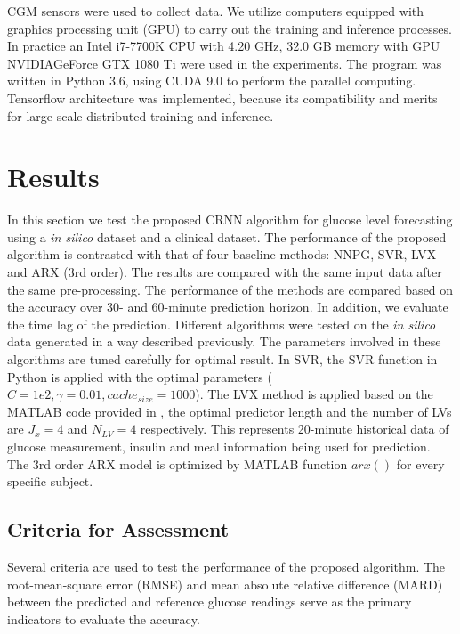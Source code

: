 \documentclass[a4paper, 10 pt, twocolumn]{IEEEtran}
\begin{document}
CGM sensors were used to collect data. We utilize computers equipped with graphics processing unit (GPU) to carry out the training and inference processes. In practice an Intel i7-7700K CPU with 4.20 GHz, 32.0 GB memory
with GPU NVIDIA\@ GeForce GTX 1080 Ti were used in the experiments. The program was written in Python 3.6, using CUDA 9.0 to perform the parallel computing.
Tensorflow architecture was implemented, because its compatibility and merits for large-scale distributed training and inference. %

\section{Results}

 In this section we test the proposed CRNN algorithm for glucose level forecasting using a \emph{in silico} dataset and a clinical dataset. The performance of the proposed algorithm is contrasted with that of four
 baseline methods: NNPG, SVR, LVX and ARX (3rd order). The results are compared with the same input data after the same pre-processing. The performance of the methods are compared based on the accuracy over 30- and
 60-minute prediction horizon. In addition, we evaluate the time lag of the prediction.
 Different algorithms were tested on the \emph{in silico} data generated in a way described previously.
The parameters involved in these algorithms are tuned carefully for optimal result. In SVR, the SVR function in Python is applied with the optimal parameters ($C=1e2, \gamma=0.01,cache_{size}=1000$). The LVX method is
applied based on the MATLAB code provided in \cite{Chunhui-PreSub2012}, the optimal predictor length and the number of LVs are $J_x = 4$ and $N_{LV} = 4$ respectively. This represents 20-minute historical data of glucose
measurement, insulin and meal information being used for prediction. The 3rd order ARX model is optimized by MATLAB function $arx()$ for every specific subject.


\subsection{Criteria for Assessment}{Several criteria are used to test the performance of the proposed algorithm. The root-mean-square error (RMSE) and mean absolute relative difference (MARD) between the predicted and reference glucose readings serve as
 the primary indicators} to evaluate the accuracy.
\end{document}
